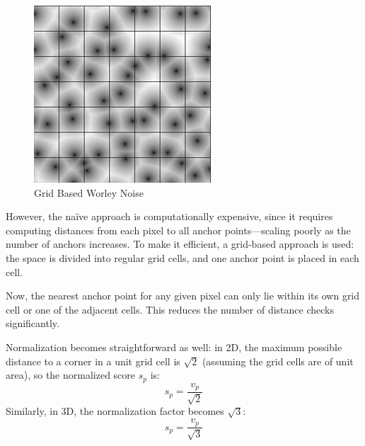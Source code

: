 \begin{figure}[H]
\begin{minipage}[t]{0.45\textwidth}
        \includegraphics[width=\textwidth]{images/worley_with_grid.jpg}
        \caption{Grid Based Worley Noise \cite{wikipedia_worley}}
        \label{fig:worley_grid}
    \end{minipage}
\end{figure}

However, the naïve approach is computationally expensive, since it requires computing distances from each pixel to all anchor points—scaling poorly as the number of anchors increases. To make it efficient, a grid-based approach is used: the space is divided into regular grid cells, and one anchor point is placed in each cell.

Now, the nearest anchor point for any given pixel can only lie within its own grid cell or one of the adjacent cells. This reduces the number of distance checks significantly.

Normalization becomes straightforward as well: in 2D, the maximum possible distance to a corner in a unit grid cell is $\sqrt{2}$ (assuming the grid cells are of unit area), so the normalized score $s_p$ is:
\[
s_p = \frac{v_p}{\sqrt{2}}
\]
Similarly, in 3D, the normalization factor becomes $\sqrt{3}$:
\[
s_p = \frac{v_p}{\sqrt{3}}
\]

